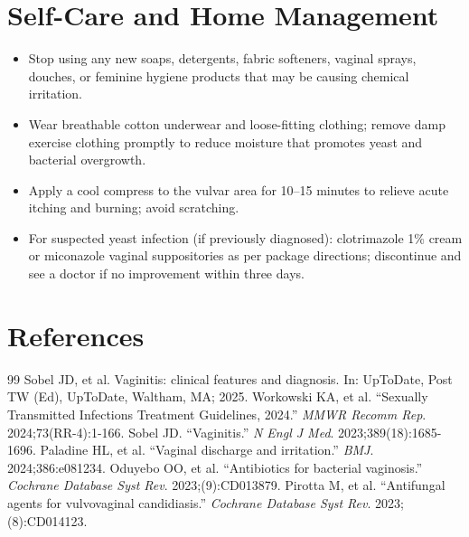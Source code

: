 \section*{Self-Care and Home Management}
\begin{itemize}
  \item Stop using any new soaps, detergents, fabric softeners, vaginal sprays, douches, or feminine hygiene products that may be causing chemical irritation.
  \item Wear breathable cotton underwear and loose-fitting clothing; remove damp exercise clothing promptly to reduce moisture that promotes yeast and bacterial overgrowth.
  \item Apply a cool compress to the vulvar area for 10--15 minutes to relieve acute itching and burning; avoid scratching.
  \item For suspected yeast infection (if previously diagnosed): clotrimazole 1\% cream or miconazole vaginal suppositories as per package directions; discontinue and see a doctor if no improvement within three days.
\end{itemize}

\section*{References}
\begin{thebibliography}{99}
 Sobel JD, et al. Vaginitis: clinical features and diagnosis. In: UpToDate, Post TW (Ed), UpToDate, Waltham, MA; 2025.
 Workowski KA, et al. ``Sexually Transmitted Infections Treatment Guidelines, 2024.'' \emph{MMWR Recomm Rep}. 2024;73(RR-4):1-166.
 Sobel JD. ``Vaginitis.'' \emph{N Engl J Med}. 2023;389(18):1685-1696.
 Paladine HL, et al. ``Vaginal discharge and irritation.'' \emph{BMJ}. 2024;386:e081234.
 Oduyebo OO, et al. ``Antibiotics for bacterial vaginosis.'' \emph{Cochrane Database Syst Rev}. 2023;(9):CD013879.
 Pirotta M, et al. ``Antifungal agents for vulvovaginal candidiasis.'' \emph{Cochrane Database Syst Rev}. 2023;(8):CD014123.
\end{thebibliography}
